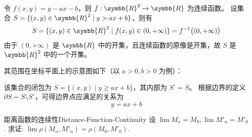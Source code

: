 \begin{myproof}
    令 $f(x, y) = y - ax - b$，则 $f: \symbb{R}^2 \to \symbb{R}$ 为连续函数。
    设集合 $S = \{ (x, y) \in \symbb{R}^2 \mid y > ax + b \}$，则有
    \begin{equation}
        S = \{ (x, y) \in \symbb{R}^2 \mid f(x, y) \in (0, +\infty) \} = f^{-1}\bigl( (0, +\infty) \bigr)
    \end{equation}
    由于 $(0, +\infty)$ 是 $\symbb{R}$ 中的开集，且连续函数的原像是开集，故 $S$ 是 $\symbb{R}^2$ 中的一个开集。

    其范围在坐标平面上的示意图如下（以 $a > 0, b > 0$ 为例）：
    \begin{center}
    \end{center}

    该集合的闭包为 $\overline{S} = \{ (x, y) \mid y \ge ax + b \}$，其内部为 $S^\circ = S$。
    根据边界的定义 $\partial S = \overline{S} \setminus S^\circ$，可得边界点应满足的关系为
    \begin{equation}
        \boxed{y = ax + b}
    \end{equation}
\end{myproof}


\begin{problem}{距离函数的连续性}{Distance-Function-Continuity}
    设 $\lim M_n = M_0, \lim M'_n = M'_0$. 求证: $\lim \rho(M_n, M'_n) = \rho(M_0, M'_0)$.
\end{problem}

